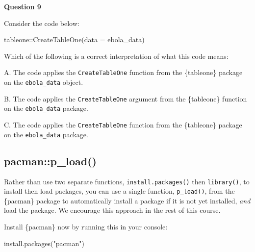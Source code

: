 \documentclass[
  letterpaper,
  DIV=11,
  numbers=noendperiod]{scrreprt}
\newenvironment{Shaded}{\begin{snugshade}}{\end{snugshade}}
\newcommand{\AttributeTok}[1]{\textcolor[rgb]{0.40,0.45,0.13}{#1}}
\newcommand{\FunctionTok}[1]{\textcolor[rgb]{0.28,0.35,0.67}{#1}}
\newcommand{\NormalTok}[1]{\textcolor[rgb]{0.00,0.23,0.31}{#1}}
\newcommand{\SpecialCharTok}[1]{\textcolor[rgb]{0.37,0.37,0.37}{#1}}
\newcommand{\StringTok}[1]{\textcolor[rgb]{0.13,0.47,0.30}{#1}}
\begin{document}
\begin{tcolorbox}[enhanced jigsaw, colframe=quarto-callout-tip-color-frame, rightrule=.15mm, opacityback=0, breakable, coltitle=black, colbacktitle=quarto-callout-tip-color!10!white, bottomrule=.15mm, leftrule=.75mm, toprule=.15mm, arc=.35mm, bottomtitle=1mm, colback=white, left=2mm, opacitybacktitle=0.6, titlerule=0mm, title=\textcolor{quarto-callout-tip-color}{\faLightbulb}\hspace{0.5em}{Practice}, toptitle=1mm]

\textbf{Question 9}

Consider the code below:

\begin{Shaded}
\begin{Highlighting}[]
\NormalTok{tableone}\SpecialCharTok{::}\FunctionTok{CreateTableOne}\NormalTok{(}\AttributeTok{data =}\NormalTok{ ebola\_data)}
\end{Highlighting}
\end{Shaded}

Which of the following is a correct interpretation of what this code
means:

A. The code applies the \texttt{CreateTableOne} function from the
\{tableone\} package on the \texttt{ebola\_data} object.

B. The code applies the \texttt{CreateTableOne} argument from the
\{tableone\} function on the \texttt{ebola\_data} package.

C. The code applies the \texttt{CreateTableOne} function from the
\{tableone\} package on the \texttt{ebola\_data} package.

\end{tcolorbox}

\hypertarget{pacmanp_load}{%
\subsection{pacman::p\_load()}\label{pacmanp_load}}

Rather than use two separate functions, \texttt{install.packages()} then
\texttt{library()}, to install then load packages, you can use a single
function, \texttt{p\_load()}, from the \{pacman\} package to
automatically install a package if it is not yet installed, \emph{and}
load the package. We encourage this approach in the rest of this course.

Install \{pacman\} now by running this in your console:

\begin{Shaded}
\begin{Highlighting}[]
\FunctionTok{install.packages}\NormalTok{(}\StringTok{"pacman"}\NormalTok{)}
\end{Highlighting}
\end{Shaded}
\end{document}
